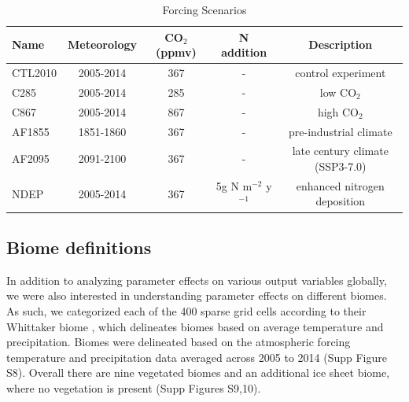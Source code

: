 \documentclass[draft]{agujournal2019}
\begin{document}
 

\label{sect:exps}
 \begin{table}[h]
 \caption{Forcing Scenarios}
 \centering
 \begin{tabular}{l c c c c}
 \hline
  Name  & Meteorology & CO$_2$ (ppmv) & N addition & Description \\
 \hline
   CTL2010  & 2005-2014 & 367 & - & control experiment\\
   C285        & 2005-2014 & 285 & - & low CO$_2$ \\
   C867        & 2005-2014 & 867 & - & high CO$_2$ \\
   AF1855    & 1851-1860 & 367 & - & pre-industrial climate \\
   AF2095    & 2091-2100 & 367 & - & late century climate (SSP3-7.0) \\
   NDEP      & 2005-2014 & 367 & 5g N m$^{-2}$  y$^{-1}$ & enhanced nitrogen deposition \\
 \hline
 \end{tabular}
 \label{tab:exps}
 \end{table}



\subsection{Biome definitions}
\label{sect:whit}
In addition to analyzing parameter effects on various output variables globally, we were also interested in understanding parameter effects on different biomes. As such, we categorized each of the 400 sparse grid cells according to their Whittaker biome \cite{whittaker1970}, which delineates biomes based on average temperature and precipitation. Biomes were delineated based on the atmospheric forcing temperature and precipitation data averaged across 2005 to 2014 (Supp Figure S8). Overall there are nine vegetated biomes and an additional ice sheet biome, where no vegetation is present (Supp Figures S9,10).
\end{document}
